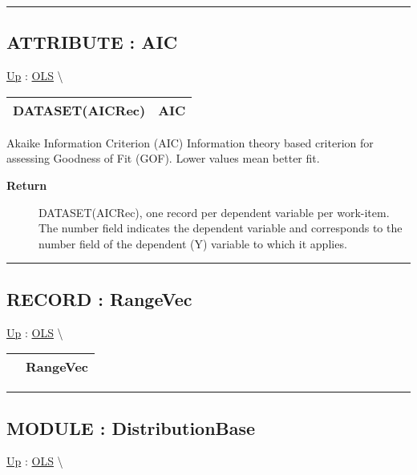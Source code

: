 \par


\rule{\linewidth}{0.5pt}
\subsection*{ATTRIBUTE : AIC}
\hypertarget{ecldoc:linearregression.ols.aic}{}
\hyperlink{ecldoc:linearregression.ols}{Up} :
\hspace{0pt} \hyperlink{ecldoc:linearregression.ols}{OLS} \textbackslash 

{\renewcommand{\arraystretch}{1.5}
\begin{tabularx}{\textwidth}{|>{\raggedright\arraybackslash}l|X|}
\hline
\hspace{0pt}DATASET(AICRec) & AIC \\
\hline
\end{tabularx}
}

\par
Akaike Information Criterion (AIC) Information theory based criterion for assessing Goodness of Fit (GOF). Lower values mean better fit.

\par
\begin{description}
\item [\textbf{Return}] DATASET(AICRec), one record per dependent variable per work-item. The number field indicates the dependent variable and corresponds to the number field of the dependent (Y) variable to which it applies.
\end{description}

\rule{\linewidth}{0.5pt}
\subsection*{RECORD : RangeVec}
\hypertarget{ecldoc:linearregression.ols.rangevec}{}
\hyperlink{ecldoc:linearregression.ols}{Up} :
\hspace{0pt} \hyperlink{ecldoc:linearregression.ols}{OLS} \textbackslash 

{\renewcommand{\arraystretch}{1.5}
\begin{tabularx}{\textwidth}{|>{\raggedright\arraybackslash}l|X|}
\hline
\hspace{0pt} & RangeVec \\
\hline
\end{tabularx}
}

\par


\rule{\linewidth}{0.5pt}
\subsection*{MODULE : DistributionBase}
\hypertarget{ecldoc:linearregression.ols.distributionbase}{}
\hyperlink{ecldoc:linearregression.ols}{Up} :
\hspace{0pt} \hyperlink{ecldoc:linearregression.ols}{OLS} \textbackslash 

